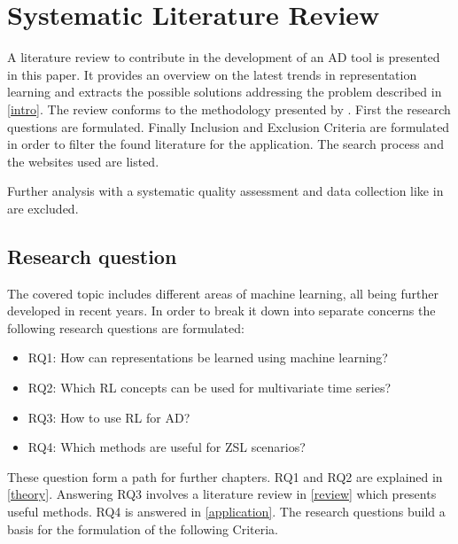 \section{Systematic Literature Review}\label{methods}
A literature review to contribute in the development of an AD tool is presented in this paper. It provides an overview on the latest trends in representation learning and extracts the possible solutions addressing the problem described in \autoref{intro}. The review conforms to the methodology presented by \cite{kitchenham_systematic_2009}. First the research questions are formulated. Finally Inclusion and Exclusion Criteria are formulated in order to filter the found literature for the application. The search process and the websites used are listed.

Further analysis with a systematic quality assessment and data collection like in \cite{kitchenham_systematic_2009} are excluded.
\subsection{Research question}
The covered topic includes different areas of machine learning, all being further developed in recent years.
In order to break it down into separate concerns the following research questions are formulated:
\begin{itemize}
  \item RQ1: How can representations be learned using machine learning?
  \item RQ2: Which RL concepts can be used for multivariate time series?
  \item RQ3: How to use RL for AD?
  \item RQ4: Which methods are useful for ZSL scenarios?
\end{itemize}
These question form a path for further chapters. RQ1 and RQ2 are explained in \autoref{theory}. Answering RQ3 involves a literature review in \autoref{review} which presents useful methods. RQ4 is answered in \autoref{application}. The research questions build a basis for the formulation of the following Criteria.

